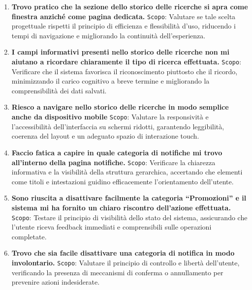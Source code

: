 \begin{enumerate}
	
	\item \textbf{Trovo pratico che la sezione dello storico delle ricerche si apra come finestra anziché come pagina dedicata.}
	\newline
	\texttt{Scopo}: Valutare se tale scelta progettuale rispetti il principio di efficienza e flessibilità d’uso, riducendo i tempi di navigazione e migliorando la continuità dell’esperienza.
	
	\item \textbf{I campi informativi presenti nello storico delle ricerche non mi aiutano a ricordare chiaramente il tipo di ricerca effettuata.}
	\newline
	\texttt{Scopo}: Verificare che il sistema favorisca il riconoscimento piuttosto che il ricordo, minimizzando il carico cognitivo a breve termine e migliorando la comprensibilità dei dati salvati.
	
	\item \textbf{Riesco a navigare nello storico delle ricerche in modo semplice anche da dispositivo mobile}
	\newline
	\texttt{Scopo}: Valutare la responsività e l’accessibilità dell’interfaccia su schermi ridotti, garantendo leggibilità, coerenza del layout e un adeguato spazio di interazione touch.
	
	\item \textbf{Faccio fatica a capire in quale categoria di notifiche mi trovo all’interno della pagina notifiche.}
	\newline
	\texttt{Scopo}: Verificare la chiarezza informativa e la visibilità della struttura gerarchica, accertando che elementi come titoli e intestazioni guidino efficacemente l’orientamento dell’utente.
	
	\item \textbf{Sono riuscita a disattivare facilmente la categoria “Promozioni” e il sistema mi ha fornito un chiaro riscontro dell’azione effettuata.}
	\newline
	\texttt{Scopo}: Testare il principio di visibilità dello stato del sistema, assicurando che l’utente riceva feedback immediati e comprensibili sulle operazioni completate.
	
	\item \textbf{Trovo che sia facile disattivare una categoria di notifica in modo involontario.}
	\newline
	\texttt{Scopo}: Valutare il principio di controllo e libertà dell’utente, verificando la presenza di meccanismi di conferma o annullamento per prevenire azioni indesiderate.
	

\end{enumerate}
